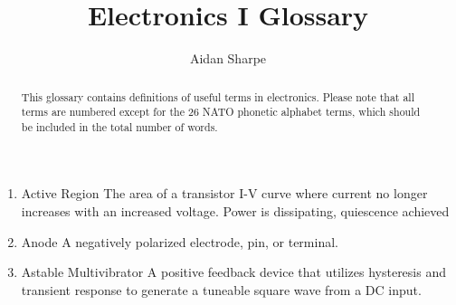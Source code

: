 \documentclass{IEEEtran}
\title{Electronics I Glossary}
\author{Aidan Sharpe}
\begin{document}
\maketitle

\begin{abstract}
  This glossary contains definitions of useful terms in electronics. Please note that all terms are numbered except for the 26 NATO phonetic alphabet terms, which should be included in the total number of words.
\end{abstract}

\begin{enumerate}
\item Active Region
  \subitem The area of a transistor I-V curve where current no longer increases with an increased voltage. Power is dissipating, quiescence achieved \\
\item Anode
  \subitem A negatively polarized electrode, pin, or terminal.\\
\item Astable Multivibrator
  \subitem A positive feedback device that utilizes hysteresis and transient response to generate a tuneable square wave from a DC input. \\


\end{enumerate}
\end{document}
